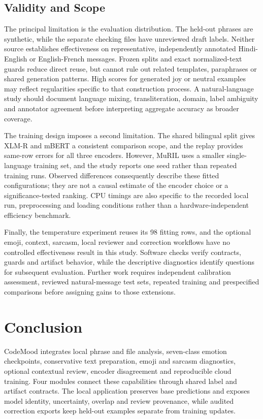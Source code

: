\documentclass[journal]{IEEEtran}
\begin{document}
\subsection{Validity and Scope}

The principal limitation is the evaluation distribution. The held-out phrases are synthetic, while the separate checking files have unreviewed draft labels. Neither source establishes effectiveness on representative, independently annotated Hindi-English or English-French messages. Frozen splits and exact normalized-text guards reduce direct reuse, but cannot rule out related templates, paraphrases or shared generation patterns. High scores for generated joy or neutral examples may reflect regularities specific to that construction process. A natural-language study should document language mixing, transliteration, domain, label ambiguity and annotator agreement before interpreting aggregate accuracy as broader coverage.

The training design imposes a second limitation. The shared bilingual split gives XLM-R and mBERT a consistent comparison scope, and the replay provides same-row errors for all three encoders. However, MuRIL uses a smaller single-language training set, and the study reports one seed rather than repeated training runs. Observed differences consequently describe these fitted configurations; they are not a causal estimate of the encoder choice or a significance-tested ranking. CPU timings are also specific to the recorded local run, preprocessing and loading conditions rather than a hardware-independent efficiency benchmark.

Finally, the temperature experiment reuses its 98 fitting rows, and the optional emoji, context, sarcasm, local reviewer and correction workflows have no controlled effectiveness result in this study. Software checks verify contracts, guards and artifact behavior, while the descriptive diagnostics identify questions for subsequent evaluation. Further work requires independent calibration assessment, reviewed natural-message test sets, repeated training and prespecified comparisons before assigning gains to those extensions.

\FloatBarrier
\section{Conclusion}

CodeMood integrates local phrase and file analysis, seven-class emotion checkpoints, conservative text preparation, emoji and sarcasm diagnostics, optional contextual review, encoder disagreement and reproducible cloud training. Four modules connect these capabilities through shared label and artifact contracts. The local application preserves base predictions and exposes model identity, uncertainty, overlap and review provenance, while audited correction exports keep held-out examples separate from training updates.
\end{document}
